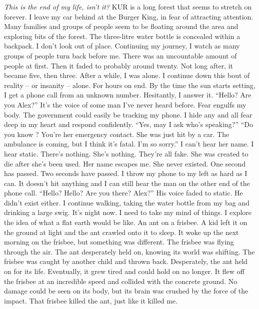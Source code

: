 \documentclass[a4paper, 12pt]{book}
\newcommand\tab[1][1cm]{\hspace*{#1}}
\begin{document}
\tab
\textit{This is the end of my life, isn’t it?}
\newline
\tab
KUR is a long forest that seems to stretch on forever. I leave my car behind at the Burger King, in fear of attracting attention. Many families and groups of people seem to be floating around the area and exploring bits of the forest. The three-litre water bottle is concealed within a backpack. I don’t look out of place.  
\newline
\tab
Continuing my journey, I watch as many groups of people turn back before me. There was an uncountable amount of people at first. Then it faded to probably around twenty. Not long after, it became five, then three. After a while, I was alone. I continue down this bout of reality – or insanity – alone. For hours on end. By the time the sun starts setting, I get a phone call from an unknown number. Hesitantly, I answer it. 
\newline
\tab
“Hello? Are you Alex?” It’s the voice of some man I’ve never heard before. Fear engulfs my body. The government could easily be tracking my phone.
\newline
\tab
I hide any and all fear deep in my heart and respond confidently. “Yes, may I ask who’s speaking?” 
\newline
\tab
“Do you know \underline{\hspace{2cm}}? You’re her emergency contact. She was just hit by a car. The ambulance is coming, but I think it’s fatal. I’m so sorry.” 
\newline
\tab
I can’t hear her name. I hear static. There’s nothing. She’s nothing. They’re all fake. She was created to die after she’s been used. Her name escapes me. She never existed. One second has passed. Two seconds have passed. I throw my phone to my left as hard as I can. It doesn’t hit anything and I can still hear the man on the other end of the phone call. 
\newline
\tab
“Hello? Hello? Are you there? Alex?” 
\newline
\tab
His voice faded to static. He didn’t exist either. I continue walking, taking the water bottle from my bag and drinking a large swig. It’s night now. I need to take my mind of things. I explore the idea of what a flat earth would be like. 
\newline
\tab
An ant on a frisbee. A kid left it on the ground at light and the ant crawled onto it to sleep. It woke up the next morning on the frisbee, but something was different. The frisbee was flying through the air. The ant desperately held on, knowing its world was shifting. The frisbee was caught by another child and thrown back. Desperately, the ant held on for its life. Eventually, it grew tired and could hold on no longer. It flew off the frisbee at an incredible speed and collided with the concrete ground. No damage could be seen on its body, but its brain was crushed by the force of the impact. That frisbee killed the ant, just like it killed me. 
\end{document}
